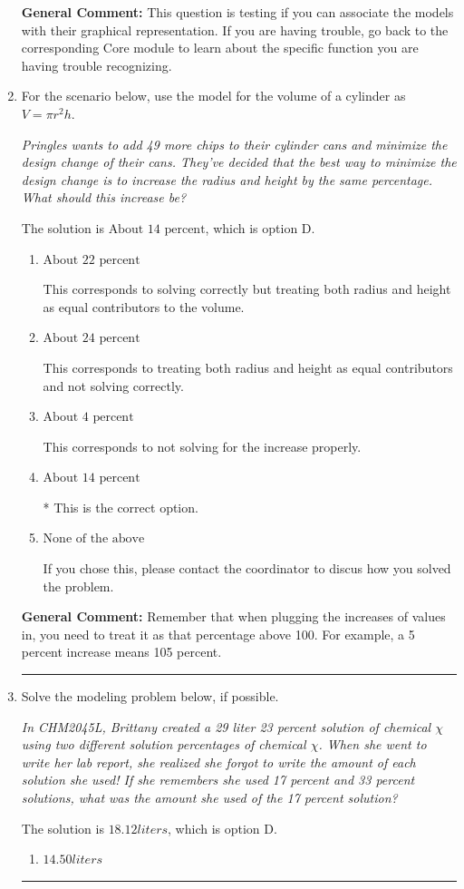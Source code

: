 \documentclass{extbook}[14pt]
\newcommand{\litem}[1]{\item #1

\rule{\textwidth}{0.4pt}}
\begin{document}
\begin{enumerate}
{\textbf{General Comment:} This question is testing if you can associate the models with their graphical representation. If you are having trouble, go back to the corresponding Core module to learn about the specific function you are having trouble recognizing.
}
\litem{
For the scenario below, use the model for the volume of a cylinder as $V = \pi r^2 h$.

\begin{center}
    \textit{ Pringles wants to add 49 \text{percent} more chips to their cylinder cans and minimize the design change of their cans. They've decided that the best way to minimize the design change is to increase the radius and height by the same percentage. What should this increase be? }
\end{center}
The solution is \( \text{About } 14 \text{ percent} \), which is option D.\begin{enumerate}[label=\Alph*.]
\item \( \text{About } 22 \text{ percent} \)

This corresponds to solving correctly but treating both radius and height as equal contributors to the volume.
\item \( \text{About } 24 \text{ percent} \)

This corresponds to treating both radius and height as equal contributors and not solving correctly.
\item \( \text{About } 4 \text{ percent} \)

This corresponds to not solving for the increase properly.
\item \( \text{About } 14 \text{ percent} \)

* This is the correct option.
\item \( \text{None of the above} \)

If you chose this, please contact the coordinator to discus how you solved the problem.
\end{enumerate}

\textbf{General Comment:} Remember that when plugging the increases of values in, you need to treat it as that percentage above 100. For example, a 5 percent increase means 105 percent.
}
\litem{
Solve the modeling problem below, if possible.

\begin{center}
    \textit{ In CHM2045L, Brittany created a 29 liter 23 percent solution of chemical $\chi$ using two different solution percentages of chemical $\chi$. When she went to write her lab report, she realized she forgot to write the amount of each solution she used! If she remembers she used 17 percent and 33 percent solutions, what was the amount she used of the 17 percent solution? }
\end{center}
The solution is \( 18.12 liters \), which is option D.\begin{enumerate}[label=\Alph*.]
\item \( 14.50 liters \)


\end{enumerate}}
\end{enumerate}
\end{document}
